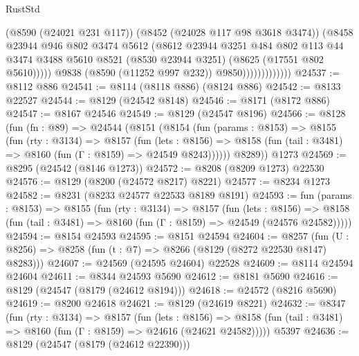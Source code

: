 \begin{lexlean}{RustStd}
\begin{coremodule}
                                (@8590 (@24021 @231 @117))
                                (@8452 (@24028 @117 @98 @3618 @3474))
                                (@8458
                                  @23944
                                  @946
                                  @802
                                  @3474
                                  @5612
                                  (@8612
                                    @23944
                                    @3251
                                    @484
                                    @802
                                    @113
                                    @44
                                    @3474
                                    @3488
                                    @5610
                                    @8521
                                    (@8530 @23944 @3251)
                                    (@8625 (@17551 @802 @5610)))))
                              @9838
                              (@8590 (@11252 @997 @232))
                              @9850)))))))))))))
@24537 := @8112 @886
@24541 := @8114 (@8118 @886) (@8124 @886)
@24542 := @8133 @22527
@24544 := @8129 (@24542 @8148)
@24546 := @8171 (@8172 @886)
@24547 := @8167 @24546
@24549 := @8129 (@24547 @8196)
@24566 := @8128
    (fun (fn : @89) =>
    @24544
      (@8151
        (@8154
          (fun (params : @8153) =>
          @8155
            (fun (rty : @3134) =>
            @8157
              (fun (lets : @8156) =>
              @8158 (fun (tail : @3481) => @8160 (fun (Γ : @8159) => @24549 @8243))))))
        @8289))
    @1273
@24569 := @8295 (@24542 (@8146 @1273))
@24572 := @8208 (@8209 @1273) @22530
@24576 := @8129 (@8200 (@24572 @8217) @8221)
@24577 := @8234 @1273
@24582 := @8231 (@8233 @24577 @22533 @8189 @8191)
@24593 := fun (params : @8153) =>
  @8155
    (fun (rty : @3134) =>
    @8157
      (fun (lets : @8156) =>
      @8158 (fun (tail : @3481) => @8160 (fun (Γ : @8159) => @24549 (@24576 @24582)))))
@24594 := @8154 @24593
@24595 := @8151 @24594
@24604 := @8257
    (fun (U : @8256) => @8258 (fun (t : @7) => @8266 (@8129 (@8272 @22530 @8147) @8283)))
@24607 := @24569 (@24595 @24604) @22528
@24609 := @8114 @24594 @24604
@24611 := @8344 @24593 @5690
@24612 := @8181 @5690
@24616 := @8129 (@24547 (@8179 (@24612 @8194)))
@24618 := @24572 (@8216 @5690)
@24619 := @8200 @24618
@24621 := @8129 (@24619 @8221)
@24632 := @8347
    (fun (rty : @3134) =>
    @8157
      (fun (lets : @8156) =>
      @8158 (fun (tail : @3481) => @8160 (fun (Γ : @8159) => @24616 (@24621 @24582)))))
    @5397
@24636 := @8129 (@24547 (@8179 (@24612 @22390)))

\end{coremodule}
\end{lexlean}
